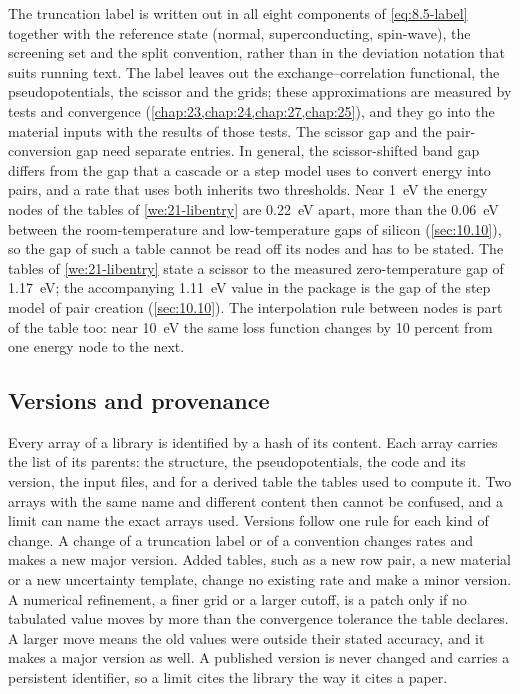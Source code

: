 The truncation label is written out in all eight components of \cref{eq:8.5-label} together with the reference state (normal, superconducting, spin-wave), the screening set and the split convention, rather than in the deviation notation that suits running text. The label leaves out the exchange--correlation functional, the pseudopotentials, the scissor and the grids; these approximations are measured by tests and convergence (\cref{chap:23,chap:24,chap:27,chap:25}), and they go into the material inputs with the results of those tests. The scissor gap and the pair-conversion gap need separate entries. In general, the scissor-shifted band gap differs from the gap that a cascade or a step model uses to convert energy into pairs, and a rate that uses both inherits two thresholds. Near \SI{1}{eV} the energy nodes of the tables of \cref{we:21-libentry} are \SI{0.22}{eV} apart, more than the \SI{0.06}{eV} between the room-temperature and low-temperature gaps of silicon (\cref{sec:10.10}), so the gap of such a table cannot be read off its nodes and has to be stated. The tables of \cref{we:21-libentry} state a scissor to the measured zero-temperature gap of \SI{1.17}{eV}; the accompanying \SI{1.11}{eV} value in the package is the gap of the step model of pair creation (\cref{sec:10.10}). The interpolation rule between nodes is part of the table too: near \SI{10}{eV} the same loss function changes by 10 percent from one energy node to the next.

\subsection{Versions and provenance}\label{sec:21.6-versions}

Every array of a library is identified by a hash of its content. Each array carries the list of its parents: the structure, the pseudopotentials, the code and its version, the input files, and for a derived table the tables used to compute it. Two arrays with the same name and different content then cannot be confused, and a limit can name the exact arrays used. Versions follow one rule for each kind of change. A change of a truncation label or of a convention changes rates and makes a new major version. Added tables, such as a new row pair, a new material or a new uncertainty template, change no existing rate and make a minor version. A numerical refinement, a finer grid or a larger cutoff, is a patch only if no tabulated value moves by more than the convergence tolerance the table declares. A larger move means the old values were outside their stated accuracy, and it makes a major version as well. A published version is never changed and carries a persistent identifier, so a limit cites the library the way it cites a paper.

